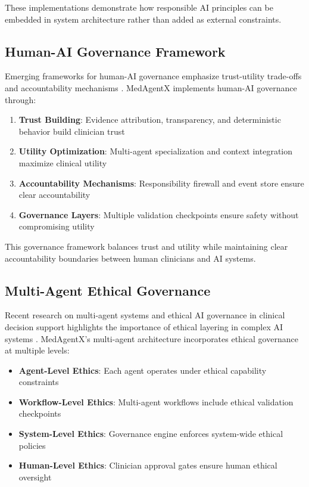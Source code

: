 \documentclass[conference]{IEEEtran}
\begin{document}
These implementations demonstrate how responsible AI principles can be embedded in system architecture rather than added as external constraints.

\subsection{Human-AI Governance Framework}
Emerging frameworks for human-AI governance emphasize trust-utility trade-offs and accountability mechanisms \cite{human_ai_governance_2025}. MedAgentX implements human-AI governance through:

\begin{enumerate}
    \item \textbf{Trust Building}: Evidence attribution, transparency, and deterministic behavior build clinician trust
    \item \textbf{Utility Optimization}: Multi-agent specialization and context integration maximize clinical utility
    \item \textbf{Accountability Mechanisms}: Responsibility firewall and event store ensure clear accountability
    \item \textbf{Governance Layers}: Multiple validation checkpoints ensure safety without compromising utility
\end{enumerate}

This governance framework balances trust and utility while maintaining clear accountability boundaries between human clinicians and AI systems.

\subsection{Multi-Agent Ethical Governance}
Recent research on multi-agent systems and ethical AI governance in clinical decision support highlights the importance of ethical layering in complex AI systems \cite{multi_agent_ethical_governance_2025}. MedAgentX's multi-agent architecture incorporates ethical governance at multiple levels:

\begin{itemize}
    \item \textbf{Agent-Level Ethics}: Each agent operates under ethical capability constraints
    \item \textbf{Workflow-Level Ethics}: Multi-agent workflows include ethical validation checkpoints
    \item \textbf{System-Level Ethics}: Governance engine enforces system-wide ethical policies
    \item \textbf{Human-Level Ethics}: Clinician approval gates ensure human ethical oversight
\end{itemize}
\end{document}
